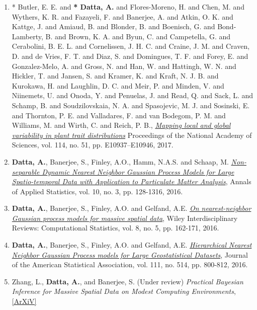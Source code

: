 \documentclass[11pt,a4paper,sans]{moderncv} %
\begin{document}
{\begin{enumerate}
\item \vskip 4mm * Butler, E. E. and \textbf{* Datta, A.} and Flores-Moreno, H. and Chen, M. and Wythers, K. R. and Fazayeli, F. and Banerjee, A. and Atkin, O. K. and Kattge, J. and Amiaud, B. and Blonder, B. and Boenisch, G. and Bond-Lamberty, B. and Brown, K. A. and Byun, C. and Campetella, G. and Cerabolini, B. E. L. and Cornelissen, J. H. C. and Craine, J. M. and Craven, D. and de Vries, F. T. and Diaz, S. and Domingues, T. F. and Forey, E. and Gonzalez-Melo, A. and Gross, N. and Han, W. and Hattingh, W. N. and Hickler, T. and Jansen, S. and Kramer, K. and Kraft, N. J. B. and Kurokawa, H. and Laughlin, D. C. and Meir, P. and Minden, V. and Niinemets, U. and Onoda, Y. and Penuelas, J. and Read, Q. and Sack, L. and Schamp, B. and Soudzilovskaia, N. A. and Spasojevic, M. J. and Sosinski, E. and Thornton, P. E. and Valladares, F. and van Bodegom, P. M. and Williams, M. and Wirth, C. and Reich, P. B.,  \href{http://www.pnas.org/content/114/51/E10937}{\em Mapping local and global variability in plant trait distributions} Proceedings of the National Academy of Sciences, vol. 114, no. 51, pp. E10937--E10946, 2017.

\item \vskip 4mm \textbf{Datta, A.}, Banerjee, S., Finley, A.O., Hamm, N.A.S. and Schaap, M.  \href{https://projecteuclid.org/euclid.aoas/1475069608}{\em Non-separable Dynamic Nearest Neighbor Gaussian Process Models for Large Spatio-temporal Data with Application to Particulate Matter Analysis}, Annals of Applied Statistics, vol. 10, no. 3, pp. 128-1316, 2016.

\item \vskip 4mm \textbf {Datta, A.}, Banerjee, S., Finley, A.O. and Gelfand, A.E.  \href{http://onlinelibrary.wiley.com/doi/10.1002/wics.1383/abstract}{\em On nearest-neighbor Gaussian process models for massive spatial data}, Wiley Interdisciplinary Reviews: Computational Statistics, vol. 8, no. 5, pp. 162-171, 2016.

\item \vskip 4mm \textbf {Datta, A.}, Banerjee, S., Finley, A.O. and Gelfand, A.E.  \href{http://www.tandfonline.com/doi/abs/10.1080/01621459.2015.1044091}{\em Hierarchical Nearest Neighbor Gaussian Process models for Large Geostatistical Datasets}, Journal of the American Statistical Association, vol. 111, no. 514, pp. 800-812, 2016.

\item \vskip 4mm Zhang, L., \textbf{Datta, A.}, and Banerjee, S. (Under review) {\em Practical Bayesian Inference for Massive Spatial Data on Modest Computing Environments}, \href{https://arxiv.org/pdf/1802.00495.pdf}{[ArXiV]}


\end{enumerate}}
\end{document}
